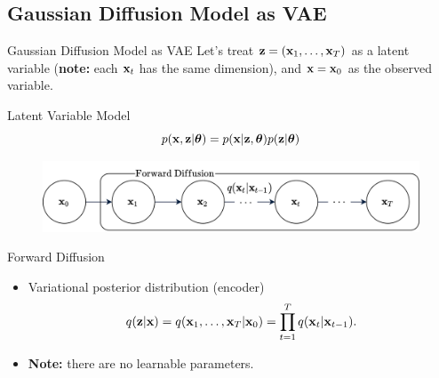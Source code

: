 \documentclass{beamer}
\begin{document}
\subsection{Gaussian Diffusion Model as VAE}
\begin{frame}{Gaussian Diffusion Model as VAE}
    Let's treat $\mathbf{z} = (\mathbf{x}_1, \dots, \mathbf{x}_T)$ as a latent variable (\textbf{note:} each $\mathbf{x}_t$ has the same dimension), and $\mathbf{x} = \mathbf{x}_0$ as the observed variable.
    \begin{block}{Latent Variable Model}
        \vspace{-0.3cm}
        \[
            p(\mathbf{x}, \mathbf{z} | \boldsymbol{\theta}) = p(\mathbf{x} | \mathbf{z}, \boldsymbol{\theta}) p(\mathbf{z} | \boldsymbol{\theta})
        \]    
        \vspace{-0.7cm}
    \end{block}
    \begin{figure}
        \includegraphics[width=0.8\linewidth]{figs/diffusion_pgm_forward}
    \end{figure}
    \vspace{-0.3cm}
    \begin{block}{Forward Diffusion}
        \begin{itemize}
            \item Variational posterior distribution (encoder)
            \vspace{-0.3cm}
            \[
                q(\mathbf{z} | \mathbf{x}) = q(\mathbf{x}_1, \dots, \mathbf{x}_T | \mathbf{x}_0) = \prod_{t = 1}^T q(\mathbf{x}_t | \mathbf{x}_{t - 1}).
            \]
            \item \textbf{Note:} there are no learnable parameters.
        \end{itemize}
        \vspace{-0.5cm}
    \end{block}
\end{frame}
\end{document}
